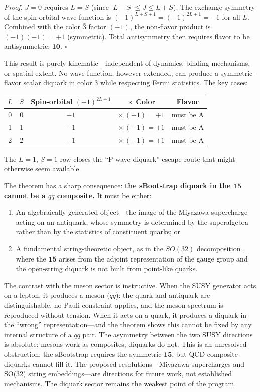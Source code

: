\documentclass[12pt,a4paper]{article}
\begin{document}
\medskip
\noindent\textit{Proof.}
$J = 0$ requires $L = S$ (since $|L - S| \leq J \leq L + S$). 
The exchange symmetry of the spin-orbital wave function is 
$(-1)^{L+S+1} = (-1)^{2L+1} = -1$ for all $L$. Combined with 
the color $\bar{3}$ factor $(-1)$, the non-flavor product is 
$(-1)(-1) = +1$ (symmetric). Total antisymmetry then requires 
flavor to be antisymmetric: $\overline{\mathbf{10}}$. \hfill$\square$

\medskip
This result is purely kinematic---independent of dynamics, 
binding mechanisms, or spatial extent. No wave function, however 
extended, can produce a symmetric-flavor scalar diquark in color 
$\bar{3}$ while respecting Fermi statistics. The key cases:

\begin{center}
\begin{tabular}{ccccc}
\toprule
$L$ & $S$ & Spin-orbital $(-1)^{2L+1}$ & $\times$ Color & Flavor \\
\midrule
0 & 0 & $-1$ & $\times\,(-1) = +1$ & must be A \\
1 & 1 & $-1$ & $\times\,(-1) = +1$ & must be A \\
2 & 2 & $-1$ & $\times\,(-1) = +1$ & must be A \\
\bottomrule
\end{tabular}
\end{center}

The $L=1$, $S=1$ row closes the ``P-wave diquark'' escape route 
that might otherwise seem available.

The theorem has a sharp consequence: \textbf{the sBootstrap 
diquark in the $\mathbf{15}$ cannot be a $qq$ composite.} It 
must be either:
\begin{enumerate}
\item An algebraically generated object---the image of the 
Miyazawa supercharge \cite{Miyazawa, CattoGursey} acting on 
an antiquark, whose symmetry is determined by the superalgebra 
rather than by the statistics of constituent quarks; or
\item A fundamental string-theoretic object, as in the $SO(32)$ 
decomposition \cite{Rivero2005}, where the $\mathbf{15}$ 
arises from the adjoint representation of the gauge group and 
the open-string diquark is not built from point-like quarks.
\end{enumerate}

The contrast with the meson sector is instructive. When the 
SUSY generator acts on a lepton, it produces a meson 
($q\bar{q}$): the quark and antiquark are distinguishable, 
no Pauli constraint applies, and the meson spectrum is 
reproduced without tension. When it acts on a quark, it 
produces a diquark in the ``wrong'' representation---and the 
theorem shows this cannot be fixed by any internal structure 
of a $qq$ pair. The asymmetry between the two SUSY directions 
is absolute: mesons work as composites; diquarks do not. 
This is an unresolved obstruction: the sBootstrap requires
the symmetric $\mathbf{15}$, but QCD composite diquarks cannot
fill it. The proposed resolutions---Miyazawa supercharges and
SO(32) string embeddings---are directions for future work, not
established mechanisms. The diquark sector remains the weakest
point of the program.
\end{document}
